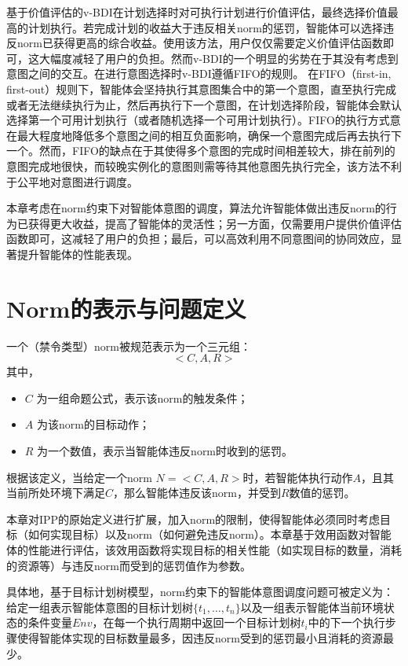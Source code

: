 基于价值评估的v-BDI\cite{DBLP:journals/eaai/MeneguzziROVL15}在计划选择时对可执行计划进行价值评估，最终选择价值最高的计划执行。若完成计划的收益大于违反相关norm的惩罚，智能体可以选择违反norm已获得更高的综合收益。使用该方法，用户仅仅需要定义价值评估函数即可，这大幅度减轻了用户的负担。然而v-BDI的一个明显的劣势在于其没有考虑到意图之间的交互。在进行意图选择时v-BDI遵循FIFO的规则。 在FIFO（first-in, first-out）规则下，智能体会坚持执行其意图集合中的第一个意图，直至执行完成或者无法继续执行为止，然后再执行下一个意图，在计划选择阶段，智能体会默认选择第一个可用计划执行（或者随机选择一个可用计划执行）。FIFO的执行方式意在最大程度地降低多个意图之间的相互负面影响，确保一个意图完成后再去执行下一个。然而，FIFO的缺点在于其使得多个意图的完成时间相差较大，排在前列的意图完成地很快，而较晚实例化的意图则需等待其他意图先执行完全，该方法不利于公平地对意图进行调度。

本章考虑在norm约束下对智能体意图的调度，\SAN 算法允许智能体做出违反norm的行为已获得更大收益，提高了智能体的灵活性；另一方面，\SAN 仅需要用户提供价值评估函数即可，这减轻了用户的负担；最后，\SAN 可以高效利用不同意图间的协同效应，显著提升智能体的性能表现。

\section{Norm的表示与问题定义}
一个（禁令类型）norm被规范表示为一个三元组：
$$<C,A,R>$$
其中，
\begin{itemize}
  \item $C$ 为一组命题公式，表示该norm的触发条件；
  \item $A$ 为该norm的目标动作；
  \item $R$ 为一个数值，表示当智能体违反norm时收到的惩罚。
\end{itemize}

根据该定义，当给定一个norm $N=<C,A,R>$时，若智能体执行动作$A$，且其当前所处环境下满足$C$，那么智能体违反该norm，并受到$R$数值的惩罚。

本章对IPP的原始定义进行扩展，加入norm的限制，使得智能体必须同时考虑目标（如何实现目标）以及norm（如何避免违反norm）。本章基于效用函数对智能体的性能进行评估，该效用函数将实现目标的相关性能（如实现目标的数量，消耗的资源等）与违反norm而受到的惩罚值作为参数。

具体地，基于目标计划树模型，norm约束下的智能体意图调度问题可被定义为：给定一组表示智能体意图的目标计划树$\{t_1, \dots, t_n\}$以及一组表示智能体当前环境状态的条件变量$Env$，在每一个执行周期中返回一个目标计划树$t_i$中的下一个执行步骤使得智能体实现的目标数量最多，因违反norm受到的惩罚最小且消耗的资源最少。

